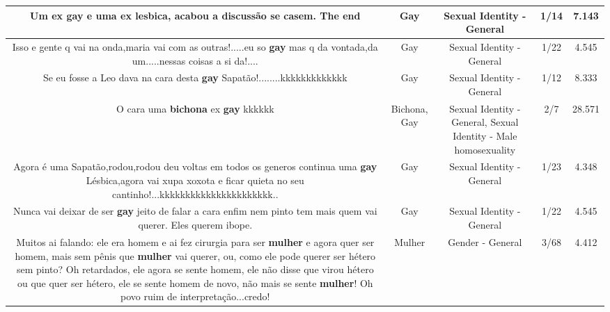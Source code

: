 \documentclass[11pt]{article}
\newlength\mylength
\begin{document}
\begin{center}
\begin{longtable}{|C{.65\mylength}|C{.30\mylength}|C{.12\mylength}|C{.12\mylength}|C{.12\mylength}|}
  \small Um ex \textbf{gay} e uma ex lesbica, acabou a discussão se casem. The end\normalsize   & Gay & Sexual Identity - General & 1/14 & 7.143 \\  \hline
  \small Isso e gente q vai na onda,maria vai com as outras!.....eu so \textbf{gay} mas q da vontada,da um.....nessas coisas a si da!....\normalsize   & Gay & Sexual Identity - General & 1/22 & 4.545 \\  \hline
  \small Se eu fosse a Leo dava na cara desta \textbf{gay} Sapatão!........kkkkkkkkkkkkk\normalsize   & Gay & Sexual Identity - General & 1/12 & 8.333 \\  \hline
  \small O cara uma \textbf{bichona} ex \textbf{gay} kkkkkk\normalsize   & Bichona, Gay & Sexual Identity - General, Sexual Identity - Male homosexuality & 2/7 & 28.571 \\  \hline
  \small Agora  é uma Sapatão,rodou,rodou deu voltas em todos os generos continua uma \textbf{gay} Lésbica,agora vai xupa xoxota e ficar quieta no seu cantinho!...kkkkkkkkkkkkkkkkkkkkkk..\normalsize   & Gay & Sexual Identity - General & 1/23 & 4.348 \\  \hline
  \small Nunca vai deixar de ser \textbf{gay}  jeito de falar a cara  enfim nem pinto  tem mais  quem vai querer. Eles querem ibope.\normalsize   & Gay & Sexual Identity - General & 1/22 & 4.545 \\  \hline
  \small Muitos ai falando: ele era homem e ai fez cirurgia para ser \textbf{mulher} e agora quer ser homem, mais sem pênis que \textbf{mulher} vai querer, ou, como ele pode querer ser hétero sem pinto? Oh retardados, ele agora se sente homem, ele não disse que virou hétero ou que quer ser hétero, ele se sente homem de novo, não mais se sente \textbf{mulher}! Oh povo ruim de interpretação...credo!\normalsize   & Mulher & Gender - General & 3/68 & 4.412 \\  \hline

\end{longtable}
\end{center}
\end{document}
